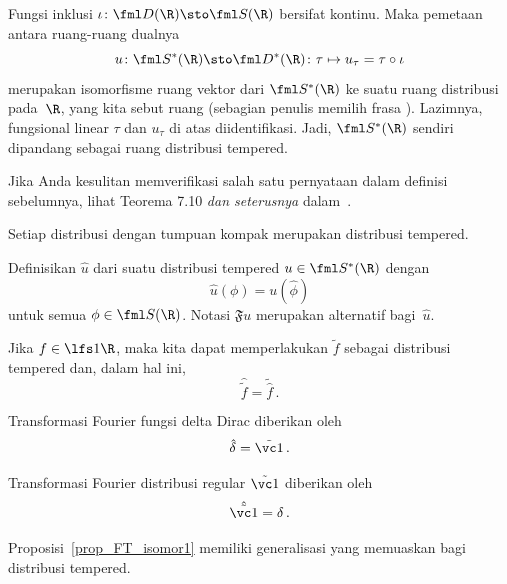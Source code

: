 \begin{defn} Fungsi inklusi $\iota\colon \fml D(\R) \sto \fml S(\R)$ bersifat kontinu. Maka pemetaan antara ruang-ruang dualnya
   \[ u\colon \fml S^*(\R) \sto \fml D^*(\R)\colon \tau \mapsto u_\tau = \tau \circ \iota \]
merupakan isomorfisme ruang vektor dari $\fml S^*(\R)$ ke suatu ruang distribusi pada~$\R$, yang kita sebut ruang
 (sebagian penulis memilih frasa
). Lazimnya, fungsional linear $\tau$ dan $u_\tau$ di atas diidentifikasi. Jadi, $\fml S^*(\R)$
sendiri dipandang sebagai ruang distribusi tempered.
\end{defn}

Jika Anda kesulitan memverifikasi salah satu pernyataan dalam definisi sebelumnya, lihat Teorema 7.10\emph{ dan seterusnya} dalam~\cite{Rudin:1991}.

\begin{exam} Setiap distribusi dengan tumpuan kompak merupakan distribusi tempered.
\end{exam}

\begin{defn} Definisikan
 $\hat u$ dari suatu distribusi tempered $u \in \fml S^*(\R)$ dengan
   \[ \hat u(\phi) = u(\hat\phi) \]
untuk semua $\phi \in \fml S(\R)$. Notasi $\mathfrak Fu$ merupakan alternatif bagi~$\hat u$.
\end{defn}

\begin{prop} Jika $f \in \lfs1\R$, maka kita dapat memperlakukan $\tilde f$ sebagai distribusi tempered dan, dalam hal ini,
   \[ \hat{\tilde f} = \tilde{\hat f}\,. \]
\end{prop}

\begin{exam} Transformasi Fourier fungsi delta Dirac diberikan oleh
   \[ \hat\delta = \tilde{\vc 1}\,. \]
\end{exam}

\begin{exam} Transformasi Fourier distribusi regular $\tilde{\vc 1}$ diberikan oleh
   \[ \hat{\tilde{\vc 1}} = \delta\,. \]
\end{exam}

Proposisi~\ref{prop_FT_isomor1} memiliki generalisasi yang memuaskan bagi distribusi tempered.

